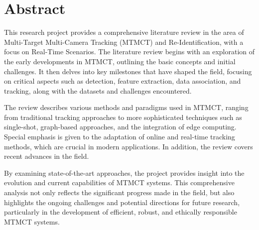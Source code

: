 \chapter*{Abstract}\label{chapter:abstract}
This research project provides a comprehensive literature review in the area of Multi-Target Multi-Camera Tracking (MTMCT) and Re-Identification, with a focus on Real-Time Scenarios. The literature review begins with an exploration of the early developments in MTMCT, outlining the basic concepts and initial challenges. It then delves into key milestones that have shaped the field, focusing on critical aspects such as detection, feature extraction, data association, and tracking, along with the datasets and challenges encountered.

The review describes various methods and paradigms used in MTMCT, ranging from traditional tracking approaches to more sophisticated techniques such as single-shot, graph-based approaches, and the integration of edge computing. Special emphasis is given to the adaptation of online and real-time tracking methods, which are crucial in modern applications. In addition, the review covers recent advances in the field.

By examining state-of-the-art approaches, the project provides insight into the evolution and current capabilities of MTMCT systems. This comprehensive analysis not only reflects the significant progress made in the field, but also highlights the ongoing challenges and potential directions for future research, particularly in the development of efficient, robust, and ethically responsible MTMCT systems.
